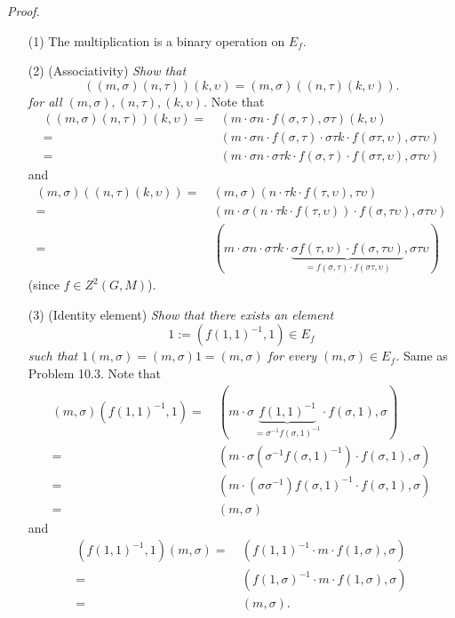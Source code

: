 \documentclass{article}
\begin{document}
\emph{Proof.}
\begin{enumerate}
\item[(1)]
  The multiplication is a binary operation on $E_f$.

\item[(2)]
  (Associativity)
  \emph{Show that
  \[
    ((m,\sigma)(n,\tau))(k,\upsilon) = (m,\sigma)((n,\tau)(k,\upsilon)).
  \]
  for all $(m,\sigma), (n,\tau), (k,\upsilon)$.}
  Note that
  \begin{align*}
    ((m,\sigma)(n,\tau))(k,\upsilon)
    = & \:
    (m \cdot \sigma n \cdot f(\sigma,\tau), \sigma\tau)(k,\upsilon) \\
    = & \:
    (m \cdot \sigma n \cdot f(\sigma,\tau)
        \cdot \sigma\tau k \cdot f(\sigma\tau, \upsilon), \sigma\tau\upsilon) \\
    = & \:
    (m \cdot \sigma n \cdot \sigma\tau k 
        \cdot f(\sigma,\tau) \cdot f(\sigma\tau, \upsilon), \sigma\tau\upsilon)
  \end{align*}
  and
  \begin{align*}
    (m,\sigma)((n,\tau)(k,\upsilon))
    = & \:
    (m,\sigma)(n \cdot \tau k \cdot f(\tau,\upsilon), \tau\upsilon) \\
    = & \:
    (m \cdot \sigma(n \cdot \tau k \cdot f(\tau,\upsilon))
        \cdot f(\sigma, \tau\upsilon), \sigma\tau\upsilon) \\
    = & \:
    (m \cdot \sigma n \cdot \sigma \tau k
        \cdot \underbrace{\sigma f(\tau,\upsilon) \cdot f(\sigma, \tau\upsilon)}_{=
            f(\sigma,\tau) \cdot f(\sigma\tau, \upsilon)},
        \sigma\tau\upsilon)
  \end{align*}
  (since $f \in Z^2(G,M)$).

\item[(3)]
  (Identity element)
  \emph{Show that there exists an element
  \[
    1 := (f(1,1)^{-1},1) \in E_f
  \]
  such that
  $1 (m,\sigma) = (m,\sigma) 1 = (m,\sigma)$ for every $(m,\sigma) \in E_f$.}
  Same as Problem 10.3.
  Note that
  \begin{align*}
    (m,\sigma)(f(1,1)^{-1},1)
    = & \:
    (m \cdot \sigma \underbrace{f(1,1)^{-1}}_{= \sigma^{-1} f(\sigma,1)^{-1}}
        \cdot f(\sigma,1), \sigma) \\
    = & \:
    (m \cdot \sigma (\sigma^{-1} f(\sigma,1)^{-1}) \cdot f(\sigma,1), \sigma) \\
    = & \:
    (m \cdot (\sigma \sigma^{-1}) f(\sigma,1)^{-1} \cdot f(\sigma,1), \sigma) \\
    = & \:
    (m, \sigma)
  \end{align*}
  and
  \begin{align*}
    (f(1,1)^{-1},1)(m,\sigma)
    = & \:
    (f(1,1)^{-1} \cdot m \cdot f(1, \sigma), \sigma) \\
    = & \:
    (f(1, \sigma)^{-1} \cdot m \cdot f(1, \sigma), \sigma) \\
    = & \:
    (m, \sigma).
  \end{align*}


\end{enumerate}
\end{document}
